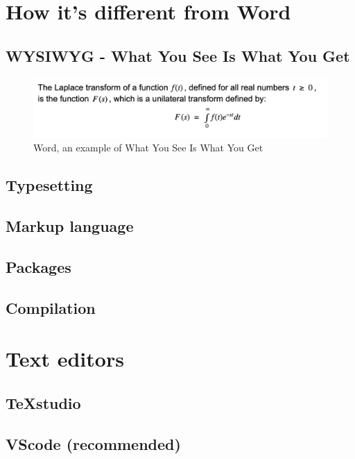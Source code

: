 \section{How it's different from Word}
    \subsection{WYSIWYG - What You See Is What You Get}
    \begin{figure}[h]
        \centering
        \includegraphics[]{figures/word.png}
        \caption{Word, an example of What You See Is What You Get}
        \label{fig:word}
    \end{figure}
    \subsection{Typesetting}
    \subsection{Markup language}
    \subsection{Packages}
    \subsection{Compilation}
\section{Text editors}
    \subsection{TeXstudio}
    \subsection{VScode (recommended)}